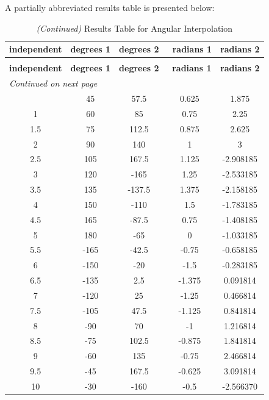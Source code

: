 \documentclass[11pt,fleqn]{report}
\begin{document}
A partially abbreviated results table is presented below:
\begin{longtable}{|c|c|c|c|c|}
\caption{Results Table for Angular Interpolation}\\
\hline
\textbf{independent} & \textbf{degrees 1} & \textbf{degrees 2} & \
\textbf{radians 1} & \textbf{radians 2}\\
\hline
\endfirsthead
\caption{\textit{(Continued)} Results Table for Angular Interpolation}\\
\hline
\textbf{independent} & \textbf{degrees 1} & \textbf{degrees 2} & \
\textbf{radians 1} & \textbf{radians 2}\\
\hline
\endhead
\hline
\multicolumn{5}{l}{\textit{Continued on next page}} \\
\endfoot
\hline
\endlastfoot
 0.5&      45&    57.5&   0.625&   1.875 \\ \hline
   1&      60&      85&    0.75&    2.25 \\ \hline
 1.5&      75&   112.5&   0.875&   2.625 \\ \hline
   2&      90&     140&       1&       3 \\ \hline
 2.5&     105&   167.5&   1.125&  -2.908185\\ \hline
   3&     120&    -165&    1.25&  -2.533185\\ \hline
 3.5&     135&  -137.5&   1.375&  -2.158185\\ \hline
   4&     150&    -110&     1.5&  -1.783185\\ \hline
 4.5&     165&   -87.5&    0.75&  -1.408185\\ \hline
   5&     180&     -65&       0&  -1.033185\\ \hline
 5.5&    -165&   -42.5&   -0.75&  -0.658185 \\ \hline
   6&    -150&     -20&    -1.5&  -0.283185 \\ \hline
 6.5&    -135&     2.5&  -1.375&   0.091814\\ \hline
   7&    -120&      25&   -1.25&   0.466814 \\ \hline
 7.5&    -105&    47.5&  -1.125&   0.841814 \\ \hline
   8&     -90&      70&      -1&   1.216814\\ \hline
 8.5&     -75&   102.5&  -0.875&   1.841814\\ \hline
   9&     -60&     135&   -0.75&   2.466814\\ \hline
 9.5&     -45&   167.5&  -0.625&   3.091814\\ \hline
  10&     -30&    -160&    -0.5&  -2.566370\\ \hline

\end{longtable}
\end{document}
